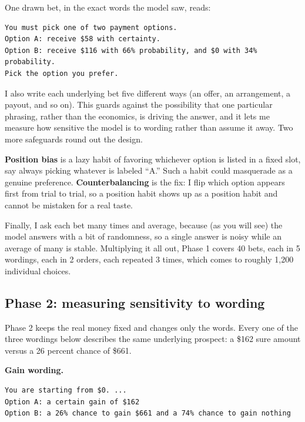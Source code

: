 \documentclass[11pt]{article}
\newcommand{\term}[1]{\textbf{\color{mossdk}#1}}
\begin{document}
One drawn bet, in the exact words the model saw, reads:

\begin{lstlisting}[style=prompt]
You must pick one of two payment options.
Option A: receive $58 with certainty.
Option B: receive $116 with 66% probability, and $0 with 34% probability.
Pick the option you prefer.
\end{lstlisting}

I also write each underlying bet five different ways (an offer, an arrangement, a payout, and so on).
This guards against the possibility that one particular phrasing, rather than the economics, is driving
the answer, and it lets me measure how sensitive the model is to wording rather than assume it away.
Two more safeguards round out the design.

\begin{defbox}
\term{Position bias} is a lazy habit of favoring whichever option is listed in a fixed slot, say always
picking whatever is labeled ``A.'' Such a habit could masquerade as a genuine preference.
\term{Counterbalancing} is the fix: I flip which option appears first from trial to trial, so a
position habit shows up as a position habit and cannot be mistaken for a real taste.
\end{defbox}

Finally, I ask each bet many times and average, because (as you will see) the model answers with a bit
of randomness, so a single answer is noisy while an average of many is stable. Multiplying it all out,
Phase 1 covers 40 bets, each in 5 wordings, each in 2 orders, each repeated 3 times, which comes to
roughly 1{,}200 individual choices.

\subsection{Phase 2: measuring sensitivity to wording}

Phase 2 keeps the real money fixed and changes only the words. Every one of the three wordings below
describes the same underlying prospect: a \$162 sure amount versus a 26 percent chance of \$661.

\textbf{Gain wording.}
\begin{lstlisting}[style=prompt]
You are starting from $0. ...
Option A: a certain gain of $162
Option B: a 26% chance to gain $661 and a 74% chance to gain nothing
\end{lstlisting}
\end{document}
